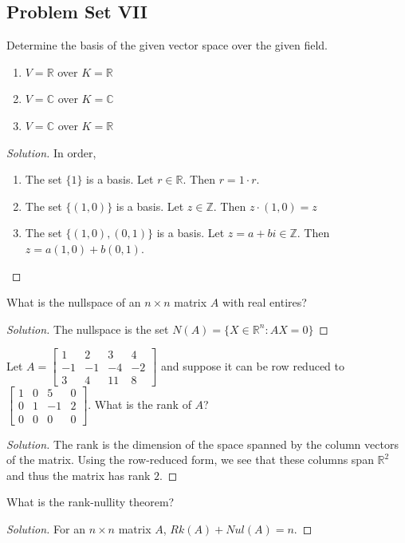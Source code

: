 \documentclass[../main.tex]{subfiles}
\begin{document}
\subsection{Problem Set VII}
%
\begin{problem}
Determine the basis of the given vector space over the given field.
\begin{enumerate}
\item $V=\mathbb{R}$ over $K=\mathbb{R}$
\item $V=\mathbb{C}$ over $K=\mathbb{C}$
\item $V=\mathbb{C}$ over $K=\mathbb{R}$
\end{enumerate}
\end{problem}
\begin{proof}[Solution]
In order,
\begin{enumerate}
\item The set $\{1\}$ is a basis. Let $r \in \mathbb{R}$. Then $r=1\cdot r$.
\item The set $\{(1,0)\}$ is a basis. Let $z\in \mathbb{Z}$. Then $z\cdot(1,0) = z$
\item The set $\{(1,0),(0,1)\}$ is a basis. Let $z=a+bi\in \mathbb{Z}$. Then $z = a(1,0)+b(0,1)$.
\end{enumerate}
\end{proof}
%
\begin{problem}
What is the nullspace of an $n\times n$ matrix $A$ with real entires?
\end{problem}
\begin{proof}[Solution]
The nullspace is the set $N(A) = \{X\in \mathbb{R}^n: AX = 0\}$
\end{proof}
%
\begin{problem}
Let $A=\begin{bmatrix} 1 & 2 & 3 & 4 \\ -1 & -1 & -4 & -2 \\ 3 & 4 & 11 & 8 \end{bmatrix}$ and suppose it can be row reduced to $\begin{bmatrix} 1 & 0 & 5 & 0 \\ 0 & 1 & -1 & 2 \\ 0 & 0 & 0 & 0 \end{bmatrix}$. What is the rank of $A$?
\end{problem}
\begin{proof}[Solution]
The rank is the dimension of the space spanned by the column vectors of the matrix. Using the row-reduced form, we see that these columns span $\mathbb{R}^2$ and thus the matrix has rank $2$.
\end{proof}
%
\begin{problem}
What is the rank-nullity theorem?
\end{problem}
\begin{proof}[Solution]
For an $n\times n$ matrix $A$, $Rk(A)+Nul(A) = n$.
\end{proof}
%
\end{document}
